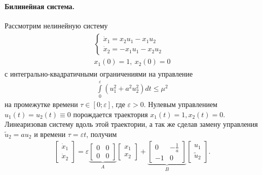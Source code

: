 \documentclass[../main.tex]{subfiles}
\begin{document}
\paragraph{Билинейная система.}
Рассмотрим нелинейную систему
\begin{gather}\label{s1:system5}
\begin{gathered}
         \left\{ {\begin{array}{*{20}{l}}
                 {\dot{x}_1 =  x_2 u_1 - x_1 u_2}\\
                 {\dot{x}_2 =  -x_1 u_1 - x_2 u_2}
         \end{array}} \right.
         \\
         x_1(0) = 1, \ x_2(0) = 0
\end{gathered}
\end{gather}
с интегрально-квадратичными ограничениями на управление
\begin{gather*}
    \int \limits_0^{\varepsilon} \left( u_1^2 + a^2 u_2^2\right) dt \leqslant \mu^2
\end{gather*}     
на промежутке времени $ \tau \in \left[0;\varepsilon \right] $, где $ \varepsilon > 0 $.
Нулевым управлением $  u_1(t) = u_2(t) \equiv 0 $ порождается траектория $ x_1(t) = 1, x_2(t) = 0 $.
Линеаризовав систему вдоль этой траектории, а так же сделав замену управления $ {\tilde u_2} = a u_2 $ и времени  $ \tau =\varepsilon t$, получим
\begin{gather}\label{s1:system5l}
     \left[ {\begin{array}{*{20}{c}}
             {{{\dot x}_1}}\\
             {{{\dot x}_2}}
     \end{array}} \right] = \varepsilon \underbrace {\left[ {\begin{array}{*{20}{c}}
                 0&0\\
                 0&0
         \end{array}} \right]}_A\left[ {\begin{array}{*{20}{c}}
             {{x_1}}\\
             {{x_2}}
     \end{array}} \right] + \underbrace {\left[ {\begin{array}{*{20}{c}}
                 0&-\frac{1}{a}\\
                 -1&0
         \end{array}} \right]}_B\left[ \begin{array}{c}
         u_1 \\ 
         \tilde{u}_2
     \end{array} \right].
\end{gather}
 
\end{document}
